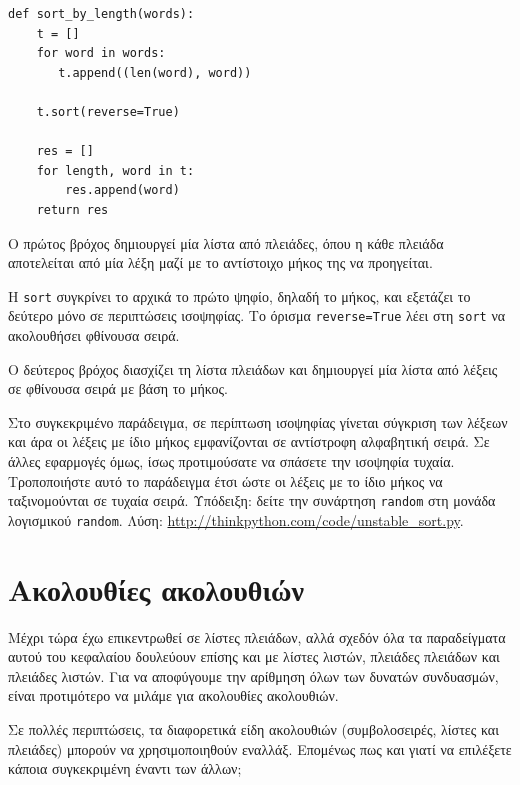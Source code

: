 \documentclass[10pt]{book}
\begin{document}
\begin{verbatim}
def sort_by_length(words):
    t = []
    for word in words:
       t.append((len(word), word))

    t.sort(reverse=True)

    res = []
    for length, word in t:
        res.append(word)
    return res
\end{verbatim}
%
Ο πρώτος βρόχος δημιουργεί μία λίστα από πλειάδες, όπου η κάθε πλειάδα αποτελείται από μία λέξη μαζί με το αντίστοιχο μήκος της να προηγείται.

Η {\tt sort} συγκρίνει το αρχικά το πρώτο ψηφίο, δηλαδή το μήκος, και εξετάζει το δεύτερο μόνο σε περιπτώσεις ισοψηφίας. Το όρισμα {\tt reverse=True} λέει στη  {\tt sort} να ακολουθήσει φθίνουσα σειρά.

Ο δεύτερος βρόχος διασχίζει τη λίστα πλειάδων και δημιουργεί μία λίστα από λέξεις σε φθίνουσα σειρά με βάση το μήκος.
\\

\begin{exercise}

Στο συγκεκριμένο παράδειγμα, σε περίπτωση ισοψηφίας γίνεται σύγκριση των λέξεων και άρα οι λέξεις με ίδιο μήκος εμφανίζονται σε αντίστροφη αλφαβητική σειρά. Σε άλλες εφαρμογές όμως, ίσως προτιμούσατε να σπάσετε την ισοψηφία τυχαία. Τροποποιήστε αυτό το παράδειγμα έτσι ώστε οι λέξεις με το ίδιο μήκος να ταξινομούνται σε τυχαία σειρά. Υπόδειξη: δείτε την συνάρτηση {\tt random} στη μονάδα λογισμικού {\tt random}. Λύση: \url{http://thinkpython.com/code/unstable_sort.py}.
\end{exercise}
 


\section{Ακολουθίες ακολουθιών}

Μέχρι τώρα έχω επικεντρωθεί σε λίστες πλειάδων, αλλά σχεδόν όλα τα παραδείγματα αυτού του κεφαλαίου δουλεύουν επίσης και με λίστες λιστών, πλειάδες πλειάδων και πλειάδες λιστών. Για να αποφύγουμε την αρίθμηση όλων των δυνατών συνδυασμών, είναι προτιμότερο να μιλάμε για ακολουθίες ακολουθιών.

Σε πολλές περιπτώσεις, τα διαφορετικά είδη ακολουθιών (συμβολοσειρές, λίστες και πλειάδες) μπορούν να χρησιμοποιηθούν εναλλάξ. Επομένως πως και γιατί να επιλέξετε κάποια συγκεκριμένη έναντι των άλλων;
\end{document}
